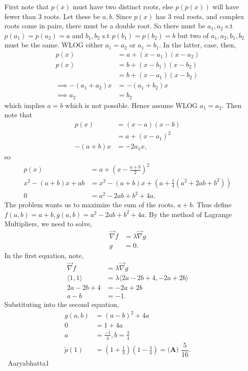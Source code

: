 \begin{enumerate}
First note that $p(x)$ must have two distinct roots, else $p(p(x))$ will have fewer than $3$ roots. Let these be $a,b.$ Since $p(x)$ has $3$ real roots, and complex roots come in pairs, there must be a double root. So there must be $a_1, a_2$ s.t $p(a_1) = p(a_2) = a$ and $b_1, b_2$ s.t $p(b_1) = p(b_2) = b$ but two of $a_1, a_2, b_1, b_2$ must be the same. WLOG either $a_1 = a_2$ or $a_1 = b_1$. In the latter, case, then, 
 \begin{align*} p(x) &= a + (x - a_1)(x - a_2) \\ p(x) &= b + (x - b_1)(x-b_2) \\ &= b + (x - a_1)(x - b_2) \\ \implies -(a_1 + a_2)x &= -(a_1 + b_2)x \\ \implies a_2 &= b_2 \end{align*}
which implies $a = b$ which is not possible. Hence assume WLOG $a_1 = a_2.$ Then note that
 \begin{align*} p(x) &= (x-a)(x - b) \\  &= a + (x- a_1)^2 \\ -(a + b)x &= -2a_1x, \end{align*}
so
 \begin{align*} p(x) &= a + \left(x - \frac{a + b}{2}\right)^2 \\ x^2 - (a + b)x + ab &= x^2 - (a + b)x + \left(a + \frac{1}{4}(a^2 + 2ab + b^2)\right) \\ 0 &= a^2 - 2ab + b^2 + 4a. \end{align*}
The problem wants us to maximize the sum of the roots, $a + b.$ Thus define $f(a,b) = a + b, g(a,b) = a^2 - 2ab + b^2 + 4a.$ By the method of Lagrange Multipliers, we need to solve,
 \begin{align*} \vec{\nabla} f &= \lambda \vec{\nabla} g \\ g &= 0. \end{align*}
In the first equation, note,
 \begin{align*} \vec{\nabla} f &= \lambda \vec{\nabla} g \\ \langle 1, 1 \rangle &= \lambda \langle 2a - 2b + 4, -2a + 2b \rangle \\ 2a - 2b + 4 &= -2a + 2b \\ a - b &= -1. \end{align*}
Substituting into the second equation, 
 \begin{align*} g(a,b) &= (a-b)^2 + 4a \\ 0 &= 1 + 4a \\ a &= \frac{-1}{4}, b = \frac{3}{4} \\ \tilde{p}(1) &= \left(1 + \frac{1}{4}\right)\left(1 - \frac{3}{4}\right) = \boxed{\textbf{(A) } \dfrac{5}{16}}. \end{align*}
~Aaryabhatta1


\end{enumerate}
